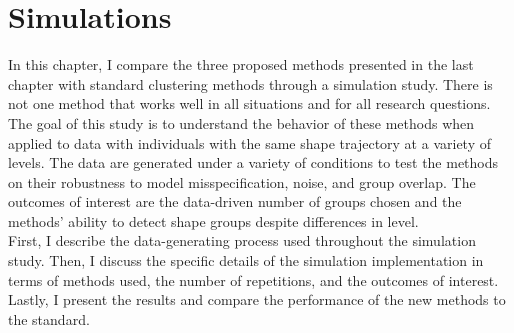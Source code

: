 \chapter{Simulations}

In this chapter, I compare the three proposed methods presented in the last chapter with standard clustering methods through a simulation study. There is not one method that works well in all situations and for all research questions. The goal of this study is to understand the behavior of these methods when applied to data with individuals with the same shape trajectory at a variety of levels. The data are generated under a variety of conditions to test the methods on their robustness to model misspecification, noise, and group overlap. The outcomes of interest are the data-driven number of groups chosen and the methods' ability to detect shape groups despite differences in level. \\

First, I describe the data-generating process used throughout the simulation study. Then, I discuss the specific details of the simulation implementation in terms of methods used, the number of repetitions, and the outcomes of interest. Lastly, I present the results and compare the performance of the new methods to the standard.
